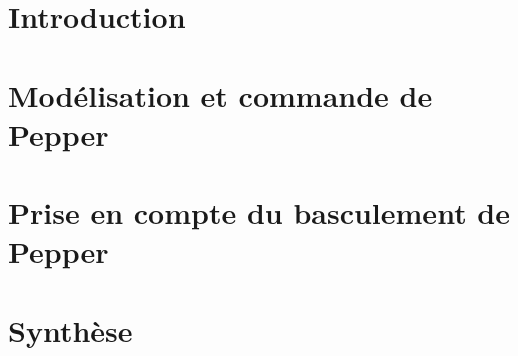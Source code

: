 \documentclass[12pt]{report}
\begin{document}
\newcommand\university{Université de Grenoble}
\newcommand\school{École doctorale EEATS}
\newcommand\structure{Laboratoire: Inria Grenoble Rhône-Alpes \\ Entreprise: Aldebaran}
\newcommand\auteur{Jory Lafaye}
\newcommand\encadrant{Dr. Pierre-Brice Wieber, Inria\\Dr. Cyrille Collette, Aldebaran\\Dr. Sebastien Dalibard, Aldebaran}
\newcommand\directeur{Dr. Bernard Brogliato, Inria\\~\\~}
\newcommand\titre{Commande des mouvements et de l'équilibre \\d'un robot humanoïde à roues omnidirectionnelles}



\tableofcontents

%
\newpage\cite{bib.miasa.2010}
%



\chapter{Introduction}
	
	
\chapter{Modélisation et commande de Pepper}
	
	
\chapter{Prise en compte du basculement de Pepper}
	
	
\chapter{Synthèse}
	
	


\appendix
	
\end{document}
